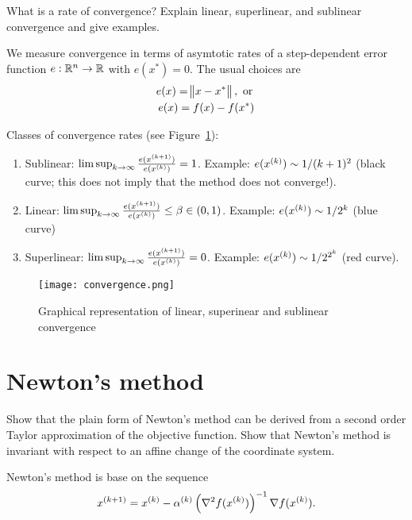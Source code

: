 \documentclass{article}
\begin{document}
\begin{question}
  What is a rate of convergence? Explain linear, superlinear, and sublinear convergence and give
  examples.
\end{question}

We measure convergence in terms of asymtotic rates of a step-dependent error function
\(e: \RR^n \to \RR\) with \(e(x^*) = 0\).  The usual choices are
\begin{gather*}
  e(x) = \enVert[1]{x - x^*}, \text{ or } \\
  e(x) = f(x) - f(x^*)
\end{gather*}

Classes of convergence rates (see Figure~\ref{fig:convergence}):
\begin{enumerate}
\item Sublinear: \(\limsup_{k \to \infty} \frac{e(\kth[k+1]{x})}{e(\kth{x})} = 1\). Example:
  \(e(\kth{x}) \sim 1/(k + 1)^2\) (black curve; this does not imply that the method does not
  converge!).
\item Linear: \(\limsup_{k \to \infty} \frac{e(\kth[k+1]{x})}{e(\kth{x})} \leq \beta \in (0, 1)\).
  Example: \(e(\kth{x}) \sim 1/2^k\) (blue curve)
\item Superlinear: \(\limsup_{k \to \infty} \frac{e(\kth[k+1]{x})}{e(\kth{x})} = 0\). Example:
  \(e(\kth{x}) \sim 1/2^{2^k}\) (red curve).
\end{enumerate}

\begin{figure}[H]
  \centering
  \texttt{[image: convergence.png]}
  \caption{Graphical representation of linear, superinear and sublinear
    convergence \label{fig:convergence}}
\end{figure}

\section{Newton's method}

\begin{question}
  Show that the plain form of Newton’s method can be derived from a second order Taylor
  approximation of the objective function. Show that Newton’s method is invariant with respect to an
  affine change of the coordinate system.
\end{question}

Newton's method is base on the sequence
\begin{equation*}
  \kth[k+1]{x} = \kth{x} - \kth{\alpha}\left( \nabla^2 f(\kth{x}) \right)^{-1} \nabla f(\kth{x}).
\end{equation*}
\end{document}
